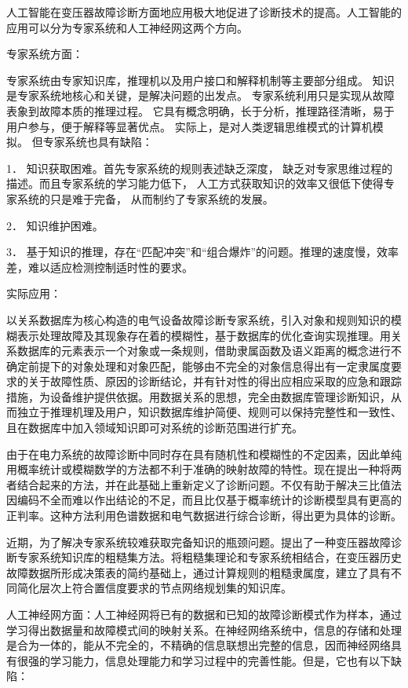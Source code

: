 \newpage

人工智能在变压器故障诊断方面地应用极大地促进了诊断技术的提高。人工智能的应用可以分为专家系统和人工神经网这两个方向。

专家系统方面：

专家系统由专家知识库，推理机以及用户接口和解释机制等主要部分组成。
知识是专家系统地核心和关键，是解决问题的出发点。
专家系统利用只是实现从故障表象到故障本质的推理过程。
它具有概念明确，长于分析，推理路径清晰，易于用户参与，便于解释等显著优点。
实际上，是对人类逻辑思维模式的计算机模拟。
但专家系统也具有缺陷：

1．	知识获取困难。首先专家系统的规则表述缺乏深度，
缺乏对专家思维过程的描述。而且专家系统的学习能力低下，
人工方式获取知识的效率又很低下使得专家系统的只是难于完备，
从而制约了专家系统的发展。

2．	知识维护困难。

3．	基于知识的推理，存在“匹配冲突”和“组合爆炸”的问题。推理的速度慢，效率差，难以适应检测控制适时性的要求。

实际应用：

以关系数据库为核心构造的电气设备故障诊断专家系统，引入对象和规则知识的模糊表示处理故障及其现象存在着的模糊性，基于数据库的优化查询实现推理。用关系数据库的元素表示一个对象或一条规则，借助隶属函数及语义距离的概念进行不确定前提下的对象处理和对象匹配，能够由不完全的对象信息得出有一定隶属度要求的关于故障性质、原因的诊断结论，并有针对性的得出应相应采取的应急和跟踪措施，为设备维护提供依据。用数据关系的思想，完全由数据库管理诊断知识，从而独立于推理机理及用户，知识数据库维护简便、规则可以保持完整性和一致性、且在数据库中加入领域知识即可对系统的诊断范围进行扩充。 

由于在电力系统的故障诊断中同时存在具有随机性和模糊性的不定因素，因此单纯用概率统计或模糊数学的方法都不利于准确的映射故障的特性。现在提出一种将两者结合起来的方法，并在此基础上重新定义了诊断问题。不仅有助于解决三比值法因编码不全而难以作出结论的不足，而且比仅基于概率统计的诊断模型具有更高的正判率。这种方法利用色谱数据和电气数据进行综合诊断，得出更为具体的诊断。

近期，为了解决专家系统较难获取完备知识的瓶颈问题。提出了一种变压器故障诊断专家系统知识库的粗糙集方法。将粗糙集理论和专家系统相结合，在变压器历史故障数据所形成决策表的简约基础上，通过计算规则的粗糙隶属度，建立了具有不同简化层次上符合置信度要求的节点网络规划集的知识库。

人工神经网方面：人工神经网将已有的数据和已知的故障诊断模式作为样本，通过学习得出数据量和故障模式间的映射关系。在神经网络系统中，信息的存储和处理是合为一体的，能从不完全的，不精确的信息联想出完整的信息，因而神经网络具有很强的学习能力，信息处理能力和学习过程中的完善性能。但是，它也有以下缺陷：

